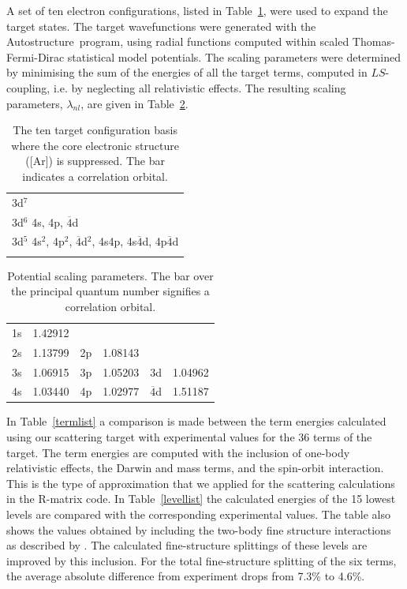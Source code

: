 \documentclass[useAMS,usenatbib]{mn2e}
\newcommand{\AS}    {{\sc Autostructure}}
\newcommand{\ps} [1]{\overline{#1}}
\begin{document}
A set of ten electron configurations, listed in Table~\ref{configs}, were used to expand the target
states. The target wavefunctions were generated with the \AS\ program, \citep{EissnerJN1974,
NussbaumerS1978, AS2011} using radial functions computed within scaled Thomas-Fermi-Dirac
statistical model potentials. The scaling parameters were determined by minimising the sum of the
energies of all the target terms, computed in $LS$-coupling, i.e. by neglecting all relativistic
effects. The resulting scaling parameters, $\lambda_{nl}$, are given in Table~\ref{scale}.

\begin{table}
\caption{The ten target configuration basis where the core electronic structure ([Ar]) is
suppressed. The bar indicates a correlation orbital.}
\begin{flushleft}
\centering
\begin{tabular}{l}
\noalign{\hrule}
3d$^7$  \\
3d$^6$ 4s, 4p, $\ps4$d  \\
3d$^5$ 4s$^2$, 4p$^2$, $\ps4$d$^2$, 4s4p, 4s$\ps4$d, 4p$\ps4$d  \\
\noalign{\hrule}
\end{tabular}
\end{flushleft}
\label{configs}
\end{table}

\begin{table}
\caption{Potential scaling parameters. The bar over the principal quantum number signifies a
correlation orbital.}
\centering %
\begin{tabular}{lr@{\hskip 1.3cm}lr@{\hskip 1.3cm}lr}
\hline
        1s &    1.42912 &            &            &            &            \\
        2s &    1.13799 &         2p &    1.08143 &            &            \\
        3s &    1.06915 &         3p &    1.05203 &         3d &    1.04962 \\
        4s &    1.03440 &         4p &    1.02977 &     $\ps4$d &   1.51187 \\
\hline
\end{tabular}
\label{scale}
\end{table}

In Table~\ref{termlist} a comparison is made between the term energies calculated using our
scattering target with experimental values for the 36 terms of the target. The term energies are
computed with the inclusion of one-body relativistic effects, the Darwin and mass terms, and the
spin-orbit interaction. This is the type of approximation that we applied for the scattering
calculations in the R-matrix code. In Table~\ref{levellist} the calculated energies of the 15
lowest levels are compared with the corresponding experimental values. The table also shows the
values obtained by including the two-body fine structure interactions as described by
\citet{EissnerJN1974}. The calculated fine-structure splittings of these levels are improved by
this inclusion. For the total fine-structure splitting of the six terms, the average absolute
difference from experiment drops from 7.3\% to 4.6\%.
\end{document}
